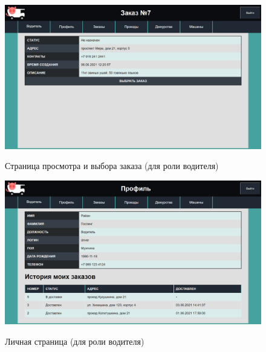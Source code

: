 \begin{figure}[h!] \label{pick_delivery_sc}
	\begin{center}
		{\includegraphics[scale=0.4, angle=0]{sc/pick_delivery}}
		\caption{Страница просмотра и выбора заказа (для роли водителя)}
	\end{center}
\end{figure}

\begin{figure}[h!] \label{driver_profile_sc}
	\begin{center}
		{\includegraphics[scale=0.4, angle=0]{sc/driver_profile}}
		\caption{Личная страница (для роли водителя)}
	\end{center}
\end{figure}

